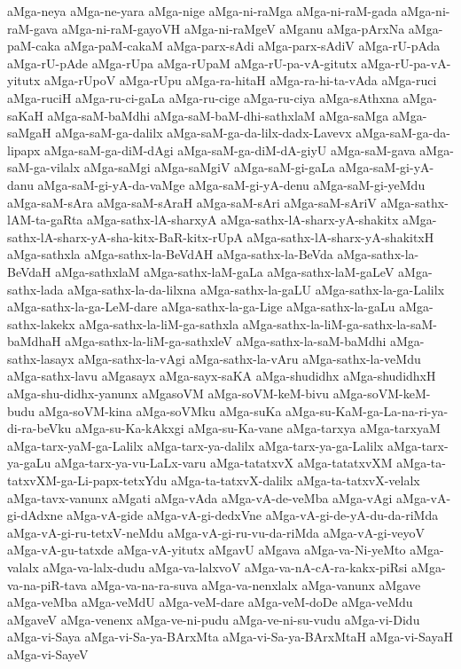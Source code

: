 {aMga-neya
aMga-ne-yara
aMga-nige
aMga-ni-raMga
aMga-ni-raM-gada
aMga-ni-raM-gava
aMga-ni-raM-gayoVH
aMga-ni-raMgeV
aMganu
aMga-pArxNa
aMga-paM-caka
aMga-paM-cakaM
aMga-parx-sAdi
aMga-parx-sAdiV
aMga-rU-pAda
aMga-rU-pAde
aMga-rUpa
aMga-rUpaM
aMga-rU-pa-vA-gitutx
aMga-rU-pa-vA-yitutx
aMga-rUpoV
aMga-rUpu
aMga-ra-hitaH
aMga-ra-hi-ta-vAda
aMga-ruci
aMga-ruciH
aMga-ru-ci-gaLa
aMga-ru-cige
aMga-ru-ciya
aMga-sAthxna
aMga-saKaH
aMga-saM-baMdhi
aMga-saM-baM-dhi-sathxlaM
aMga-saMga
aMga-saMgaH
aMga-saM-ga-dalilx
aMga-saM-ga-da-lilx-dadx-Lavevx
aMga-saM-ga-da-lipapx
aMga-saM-ga-diM-dAgi
aMga-saM-ga-diM-dA-giyU
aMga-saM-gava
aMga-saM-ga-vilalx
aMga-saMgi
aMga-saMgiV
aMga-saM-gi-gaLa
aMga-saM-gi-yA-danu
aMga-saM-gi-yA-da-vaMge
aMga-saM-gi-yA-denu
aMga-saM-gi-yeMdu
aMga-saM-sAra
aMga-saM-sAraH
aMga-saM-sAri
aMga-saM-sAriV
aMga-sathx-lAM-ta-gaRta
aMga-sathx-lA-sharxyA
aMga-sathx-lA-sharx-yA-shakitx
aMga-sathx-lA-sharx-yA-sha-kitx-BaR-kitx-rUpA
aMga-sathx-lA-sharx-yA-shakitxH
aMga-sathxla
aMga-sathx-la-BeVdAH
aMga-sathx-la-BeVda
aMga-sathx-la-BeVdaH
aMga-sathxlaM
aMga-sathx-laM-gaLa
aMga-sathx-laM-gaLeV
aMga-sathx-lada
aMga-sathx-la-da-lilxna
aMga-sathx-la-gaLU
aMga-sathx-la-ga-Lalilx
aMga-sathx-la-ga-LeM-dare
aMga-sathx-la-ga-Lige
aMga-sathx-la-gaLu
aMga-sathx-lakekx
aMga-sathx-la-liM-ga-sathxla
aMga-sathx-la-liM-ga-sathx-la-saM-baMdhaH
aMga-sathx-la-liM-ga-sathxleV
aMga-sathx-la-saM-baMdhi
aMga-sathx-lasayx
aMga-sathx-la-vAgi
aMga-sathx-la-vAru
aMga-sathx-la-veMdu
aMga-sathx-lavu
aMgasayx
aMga-sayx-saKA
aMga-shudidhx
aMga-shudidhxH
aMga-shu-didhx-yanunx
aMgasoVM
aMga-soVM-keM-bivu
aMga-soVM-keM-budu
aMga-soVM-kina
aMga-soVMku
aMga-suKa
aMga-su-KaM-ga-La-na-ri-ya-di-ra-beVku
aMga-su-Ka-kAkxgi
aMga-su-Ka-vane
aMga-tarxya
aMga-tarxyaM
aMga-tarx-yaM-ga-Lalilx
aMga-tarx-ya-dalilx
aMga-tarx-ya-ga-Lalilx
aMga-tarx-ya-gaLu
aMga-tarx-ya-vu-LaLx-varu
aMga-tatatxvX
aMga-tatatxvXM
aMga-ta-tatxvXM-ga-Li-papx-tetxYdu
aMga-ta-tatxvX-dalilx
aMga-ta-tatxvX-velalx
aMga-tavx-vanunx
aMgati
aMga-vAda
aMga-vA-de-veMba
aMga-vAgi
aMga-vA-gi-dAdxne
aMga-vA-gide
aMga-vA-gi-dedxVne
aMga-vA-gi-de-yA-du-da-riMda
aMga-vA-gi-ru-tetxV-neMdu
aMga-vA-gi-ru-vu-da-riMda
aMga-vA-gi-veyoV
aMga-vA-gu-tatxde
aMga-vA-yitutx
aMgavU
aMgava
aMga-va-Ni-yeMto
aMga-valalx
aMga-va-lalx-dudu
aMga-va-lalxvoV
aMga-va-nA-cA-ra-kakx-piRsi
aMga-va-na-piR-tava
aMga-va-na-ra-suva
aMga-va-nenxlalx
aMga-vanunx
aMgave
aMga-veMba
aMga-veMdU
aMga-veM-dare
aMga-veM-doDe
aMga-veMdu
aMgaveV
aMga-venenx
aMga-ve-ni-pudu
aMga-ve-ni-su-vudu
aMga-vi-Didu
aMga-vi-Saya
aMga-vi-Sa-ya-BArxMta
aMga-vi-Sa-ya-BArxMtaH
aMga-vi-SayaH
aMga-vi-SayeV
}
